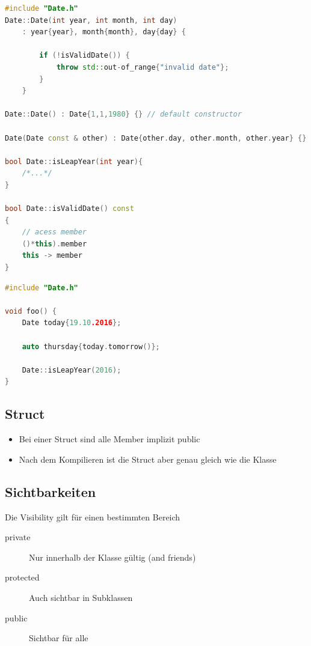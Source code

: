 \begin{lstlisting}[language=C++, caption=Implementierung des Klasse ]
#include "Date.h"
Date::Date(int year, int month, int day)
	: year{year}, month{month}, day{day} { 
	
		if (!isValidDate()) {
			throw std::out-of_range{"invalid date"};
		}
	}

Date::Date() : Date{1,1,1980} {} // default constructor

Date(Date const & other) : Date{other.day, other.month, other.year} {} // copy constructor

bool Date::isLeapYear(int year){
	/*...*/
}

bool Date::isValidDate() const
{
	// acess member
	()*this).member
	this -> member
}
\end{lstlisting}

\begin{lstlisting}[language=C++, caption=Verwendung des Klasse ]
#include "Date.h"

void foo() {
	Date today{19.10.2016};
	
	auto thursday{today.tomorrow()};
	
	Date::isLeapYear(2016);
}
\end{lstlisting}

\subsection{Struct}
\begin{itemize}
	\item Bei einer Struct sind alle Member implizit public
	\item Nach dem Kompilieren ist die Struct aber genau gleich wie die Klasse
\end{itemize}


\subsection{Sichtbarkeiten}
Die Visibility gilt für einen bestimmten Bereich
\begin{description}
	\item[private] Nur innerhalb der Klasse gültig (and friends)
	\item[protected] Auch sichtbar in Subklassen
	\item[public] Sichtbar für alle
\end{description}

\clearpage

